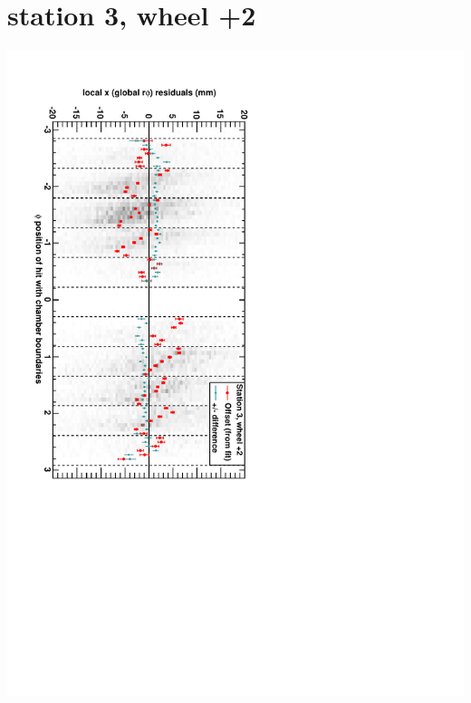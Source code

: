 \documentclass[compress]{beamer}
\begin{document}
\section*{station 3, wheel +2}
\begin{frame} \vfill \mbox{\hspace{-1 cm}\includegraphics[height=1.2\linewidth, angle=90]{DTrphiVsPhi_st3_whE.pdf}} \end{frame}
\end{document}
